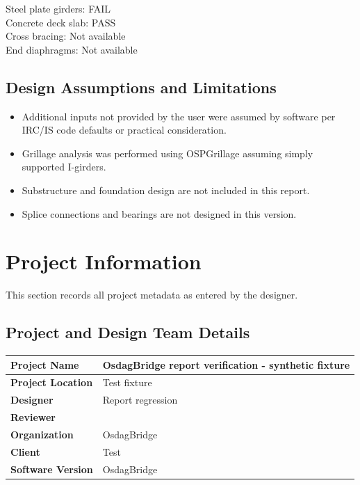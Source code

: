 \documentclass[12pt,a4paper]{report}
\numberwithin{table}{chapter}
\numberwithin{figure}{chapter}
\begin{document}
\noindent Steel plate girders:\allowbreak{} FAIL \\ Concrete deck slab:\allowbreak{} PASS \\ Cross bracing:\allowbreak{} Not available \\ End diaphragms:\allowbreak{} Not available

\section*{Design Assumptions and Limitations}
\label{sec:assumptions}

\begin{itemize}
\item Additional inputs not provided by the user were assumed by software per IRC/IS code defaults or practical consideration.
\item Grillage analysis was performed using OSPGrillage assuming simply supported I-girders.
\item Substructure and foundation design are not included in this report.
\item Splice connections and bearings are not designed in this version.
\end{itemize}

\titleformat{\chapter}[block]{\normalfont\Large\bfseries\centering}{\thechapter}{1em}{}
\titlespacing*{\chapter}{0pt}{-30pt}{10pt}


\chapter{Project Information}

This section records all project metadata as entered by the designer.

\section{Project and Design Team Details}
\label{sec:project-details}

\begin{tabular}{|L{5.5cm}|L{8.5cm}|}
\hline
\textbf{Project Name} & OsdagBridge report verification - synthetic fixture \\
\hline
\textbf{Project Location} & Test fixture \\
\hline
\textbf{Designer} & Report regression \\
\hline
\textbf{Reviewer} &  \\
\hline
\textbf{Organization} & OsdagBridge \\
\hline
\textbf{Client} & Test \\
\hline
\textbf{Software Version} & OsdagBridge \\
\hline
\end{tabular}
\end{document}
